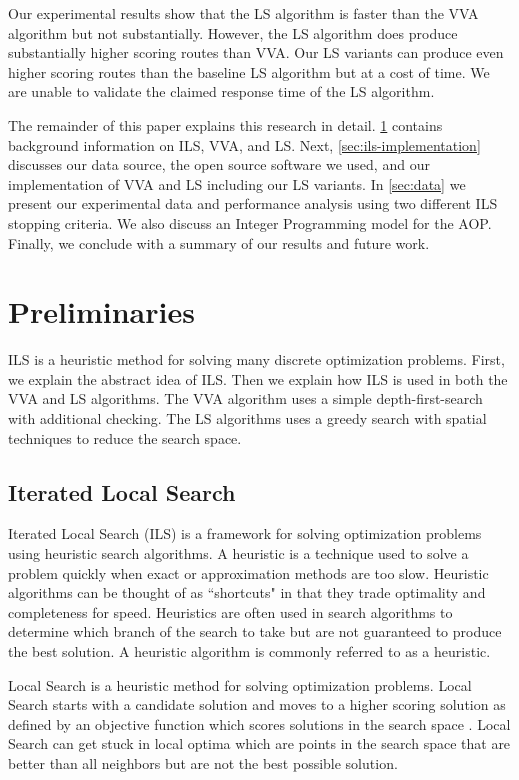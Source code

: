 \documentclass[honors]{union-cs-thesis}
\begin{document}
Our experimental results show that the LS algorithm is faster than the VVA algorithm but not substantially. However, the LS algorithm does produce substantially higher scoring routes than VVA. Our LS variants can produce even higher scoring routes than the baseline LS algorithm but at a cost of time. We are unable to validate the claimed response time of the LS algorithm.

The remainder of this paper explains this research in detail. \cref{sec:prelim} contains background information on ILS, VVA, and LS. Next, \cref{sec:ils-implementation} discusses our data source, the open source software we used, and our implementation of VVA and LS including our LS variants. In \cref{sec:data} we present our experimental data and performance analysis using two different ILS stopping criteria. We also discuss an Integer Programming model for the AOP. Finally, we conclude with a summary of our results and future work.

\section{Preliminaries}
\label{sec:prelim}
ILS is a heuristic method for solving many discrete optimization problems. First, we explain the abstract idea of ILS. Then we explain how ILS is used in both the VVA and LS algorithms. The VVA algorithm uses a simple depth-first-search with additional checking. The LS algorithms uses a greedy search with spatial techniques to reduce the search space.

\subsection{Iterated Local Search}
Iterated Local Search (ILS) is a framework for solving optimization problems using heuristic search algorithms. A heuristic is a technique used to solve a problem quickly when exact or approximation methods are too slow. Heuristic algorithms can be thought of as ``shortcuts" in that they trade optimality and completeness for speed. Heuristics are often used in search algorithms to  determine which branch of the search to take but are not guaranteed to produce the best solution. A heuristic algorithm is commonly referred to as a heuristic.

Local Search is a heuristic method for solving optimization problems. Local Search starts with a candidate solution and moves to a higher scoring solution as defined by an objective function which scores solutions in the search space \cite{gendreau2010handbook}. Local Search can get stuck in local optima which are points in the search space that are better than all neighbors but are not the best possible solution.
\end{document}
